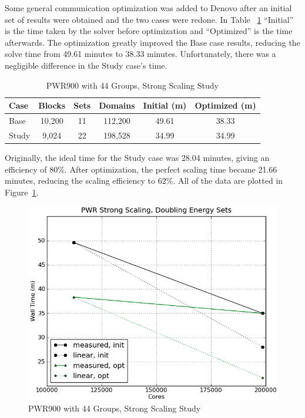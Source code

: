 Some general communication optimization was added to Denovo after an initial set of results were obtained and the two cases were redone. In Table ~\ref{table:StrongCasesPWR} ``Initial'' is the time taken by the solver before optimization and ``Optimized'' is the time afterwards. The optimization greatly improved the Base case results, reducing the solve time from 49.61 minutes to 38.33 minutes. Unfortunately, there was a negligible difference in the Study case's time. 
%
\begin{table}[!h]
\caption{PWR900 with 44 Groups, Strong Scaling Study}
\begin{center}
\begin{tabular}{| l | c | c | c | c | c |}
\hline
Case & Blocks & Sets & Domains & Initial (m) & Optimized (m) \\[0.5ex]
\hline
Base   & 10,200 & 11 & 112,200 & 49.61 & 38.33 \\
Study & 9,024    & 22 & 198,528 & 34.99 & 34.99 \\
\hline
\end{tabular}
\end{center}
\label{table:StrongCasesPWR}
\end{table}
%
Originally, the ideal time for the Study case was 28.04 minutes, giving an efficiency of 80\%. After optimization, the perfect scaling time became 21.66 minutes, reducing the scaling efficiency to 62\%. All of the data are plotted in Figure~\ref{fig:PWRstrongScaling}. 
\begin{figure}[!h]
  \begin{center}
    \includegraphics [width=.7\textwidth, height=.45\textheight ] {PWRstrongScaling}
  \end{center}
  \caption{PWR900 with 44 Groups, Strong Scaling Study}
  \label{fig:PWRstrongScaling}
\end{figure}

